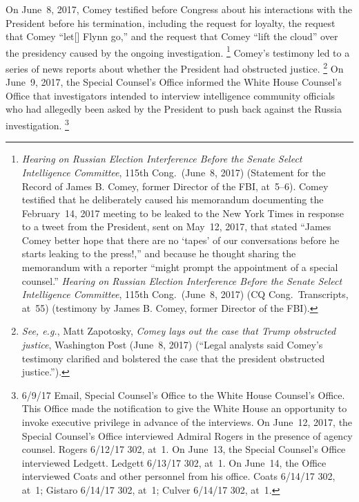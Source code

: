 On June~8, 2017, Comey testified before Congress about his interactions with the President before his termination, including the request for loyalty, the request that Comey ``let[] Flynn go,'' and the request that Comey ``lift the cloud'' over the presidency caused by the ongoing investigation.%
\footnote{\textit{Hearing on Russian Election Interference Before the Senate Select Intelligence Committee}, 115th Cong.\ (June~8, 2017) (Statement for the Record of James B. Comey, former Director of the FBI, at~5--6).
Comey testified that he deliberately caused his memorandum documenting the February~14, 2017 meeting to be leaked to the New York Times in response to a tweet from the President, sent on May~12, 2017, that stated ``James Comey better hope that there are no `tapes' of our conversations before he starts leaking to the press!,'' and because he thought sharing the memorandum with a reporter ``might prompt the appointment of a special counsel.''
\textit{Hearing on Russian Election Interference Before the Senate Select Intelligence Committee}, 115th Cong.\ (June~8, 2017) (CQ Cong.\ Transcripts, at~55) (testimony by James B. Comey, former Director of the FBI).}
Comey's testimony led to a series of news reports about whether the President had obstructed justice.%
\footnote{\textit{See, e.g.}, Matt Zapotosky, \textit{Comey lays out the case that Trump obstructed justice}, Washington Post (June~8, 2017) (``Legal analysts said Comey's testimony clarified and bolstered the case that the president obstructed justice.'').}
On June~9, 2017, the Special Counsel's Office informed the White House Counsel's Office that investigators intended to interview intelligence community officials who had allegedly been asked by the President to push back against the Russia investigation.%
\footnote{6/9/17 Email, Special Counsel's Office to the White House Counsel's Office.
This Office made the notification to give the White House an opportunity to invoke executive privilege in advance of the interviews.
On June~12, 2017, the Special Counsel's Office interviewed Admiral Rogers in the presence of agency counsel.
Rogers 6/12/17 302, at~1.
On June~13, the Special Counsel's Office interviewed Ledgett.
Ledgett 6/13/17 302, at~1.
On June~14, the Office interviewed Coats and other personnel from his office.
Coats 6/14/17 302, at~1;
Gistaro 6/14/17 302, at~1;
Culver 6/14/17 302, at~1.}

